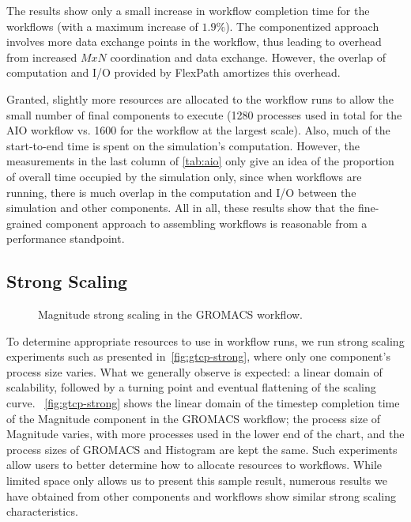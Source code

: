 The results show only a small increase in
workflow completion time for the \sys
workflows (with a maximum increase of $1.9 \%$).
The componentized
approach involves more data exchange points
in the workflow, thus leading to
overhead from increased $MxN$ coordination and data exchange.
However, the overlap of computation and I/O provided by FlexPath
amortizes this overhead.

Granted, slightly more resources are allocated to the
\sys workflow runs to allow the small number
of final components to execute (1280 processes
used in total for the AIO workflow vs. 1600 for
the \sys workflow at the largest scale).
Also, much of the start-to-end time is spent on
the simulation's computation.
However, the measurements in the last column
of \autoref{tab:aio}
only give an idea of the proportion of 
overall time occupied by the simulation only,
since when workflows are running, there is much
overlap in the computation and I/O between the
simulation and other components. All in all,
these results show that the
fine-grained component approach
to assembling workflows
is reasonable from a performance standpoint.

\subsection{Strong Scaling}
\begin{figure}
  \centering
  \vspace{-0.08in}
  
  \vspace{-0.12in}
  \caption{Magnitude strong scaling in the GROMACS workflow.}
  \label{fig:gtcp-strong}
  \vspace{-0.25in}
\end{figure}
To determine appropriate resources
to use in workflow runs,
we run strong scaling experiments such
as presented in~\autoref{fig:gtcp-strong},
where only one component's process size
varies.
What we generally observe is expected: a linear domain of
scalability, followed by a turning point
and eventual flattening of the scaling curve.
~\autoref{fig:gtcp-strong} shows the
linear domain of the timestep
completion time of the Magnitude component
in the GROMACS workflow; the process size of Magnitude
varies, with more processes used in the lower
end of the chart, and the process sizes of
GROMACS and Histogram are kept the same.
Such experiments allow users
to better determine how to allocate resources to \sys workflows.
While limited space only allows us to present this sample
result, numerous results we
have obtained from other components
and workflows show similar strong scaling characteristics.


